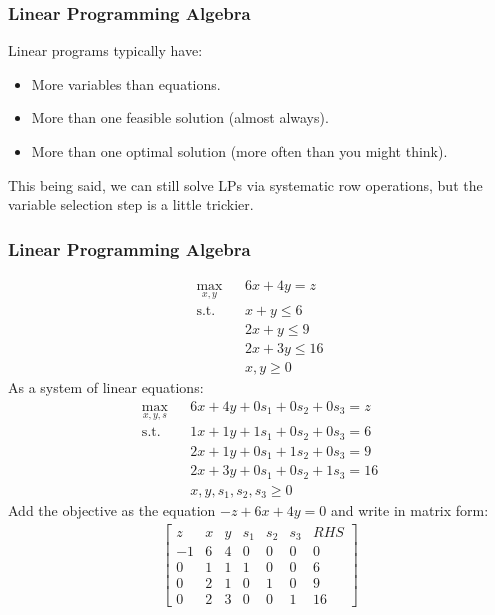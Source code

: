 \documentclass[12pt,handout]{beamer}
\begin{document}
\begin{frame}
\frametitle{Linear Programming Algebra}
Linear programs typically have:
	\begin{itemize}
	\item More variables than equations.
	\item More than one feasible solution (almost always).
	\item More than one optimal solution (more often than you might think).
	\end{itemize}
This being said, we can still solve LPs via systematic row operations, but the variable selection step is a little trickier.
\end{frame}

\begin{frame}
\frametitle{Linear Programming Algebra}
\tiny
\begin{eqnarray}
\max_{x,y} && 6x + 4y = z \nonumber \\
\mbox{s.t.} && x + y \le 6 \nonumber \\
&& 2x + y \le 9 \nonumber \\
&& 2x + 3y \le 16 \nonumber \\
&& x, y \ge 0 \nonumber
\end{eqnarray}
As a system of linear equations:
\begin{eqnarray}
\max_{x,y,s} && 6x + 4y + 0 s_1 + 0 s_2 + 0 s_3 = z\nonumber \\
\mbox{s.t.} && 1x + 1y + 1s_1 + 0 s_2 + 0 s_3 = 6 \nonumber \\
&& 2x + 1y + 0s_1 + 1s_2 + 0s_3 = 9 \nonumber \\
&& 2x + 3y + 0s_1 + 0s_2 + 1s_3 = 16 \nonumber \\
&& x, y, s_1, s_2, s_3 \ge 0 \nonumber
\end{eqnarray}
Add the objective as the equation $-z + 6x + 4y = 0$ and write in matrix form:
\begin{eqnarray}
\left[ \begin{array}{rrrrrr|r}
z & x & y & s_1 & s_2 & s_3 & RHS \\
-1 & 6 & 4 & 0 & 0 & 0 & 0 \\
0 & 1 & 1 & 1 & 0 & 0 & 6 \\
0 & 2 & 1 & 0 & 1 & 0 & 9 \\
0 & 2 & 3 & 0 & 0 & 1 & 16
\end{array} \right] \nonumber
\end{eqnarray}
\end{frame}
\end{document}
